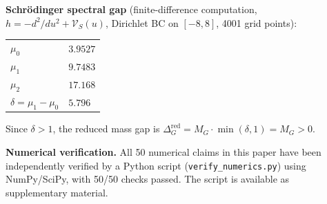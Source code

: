 \documentclass[12pt]{article}
\theoremstyle{plain}
\theoremstyle{definition}
\numberwithin{equation}{section}
\newcommand{\red}{\mathrm{red}}
\begin{document}
\medskip

\noindent\textbf{Schr\"odinger spectral gap} (finite-difference computation, $h=-d^2/du^2+\mathcal{V}_S(u)$, Dirichlet BC on $[-8,8]$, 4001 grid points):
\begin{center}
\begin{tabular}{ll}
$\mu_0$ & $3.9527$\\
$\mu_1$ & $9.7483$\\
$\mu_2$ & $17.168$\\
$\delta=\mu_1-\mu_0$ & $5.796$\\
\end{tabular}
\end{center}
Since $\delta>1$, the reduced mass gap is $\Delta_G^{\red}=M_G\cdot\min(\delta,1)=M_G>0$.

\medskip

\noindent\textbf{Numerical verification.}  All 50 numerical claims in this paper have been independently verified by a Python script (\texttt{verify\_numerics.py}) using NumPy/SciPy, with 50/50 checks passed.  The script is available as supplementary material.
\end{document}
